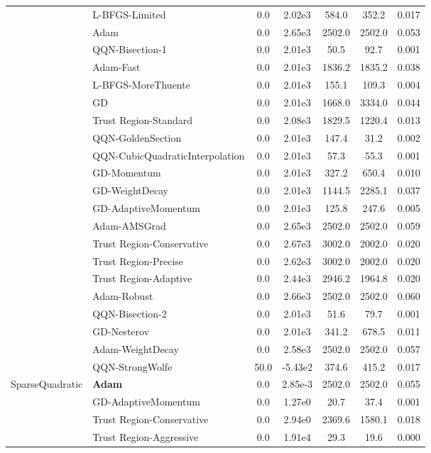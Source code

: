 \documentclass{article}
\begin{document}
\begin{table}[htbp]
{\begin{tabular}{p{2.5cm}p{2.5cm}*{5}{c}}
 & L-BFGS-Limited & 0.0 & 2.02e3 & 584.0 & 352.2 & 0.017 \\
 & Adam & 0.0 & 2.65e3 & 2502.0 & 2502.0 & 0.053 \\
 & QQN-Bisection-1 & 0.0 & 2.01e3 & 50.5 & 92.7 & 0.001 \\
 & Adam-Fast & 0.0 & 2.01e3 & 1836.2 & 1835.2 & 0.038 \\
 & L-BFGS-MoreThuente & 0.0 & 2.01e3 & 155.1 & 109.3 & 0.004 \\
 & GD & 0.0 & 2.01e3 & 1668.0 & 3334.0 & 0.044 \\
 & Trust Region-Standard & 0.0 & 2.08e3 & 1829.5 & 1220.4 & 0.013 \\
 & QQN-GoldenSection & 0.0 & 2.01e3 & 147.4 & 31.2 & 0.002 \\
 & QQN-CubicQuadraticInterpolation & 0.0 & 2.01e3 & 57.3 & 55.3 & 0.001 \\
 & GD-Momentum & 0.0 & 2.01e3 & 327.2 & 650.4 & 0.010 \\
 & GD-WeightDecay & 0.0 & 2.01e3 & 1144.5 & 2285.1 & 0.037 \\
 & GD-AdaptiveMomentum & 0.0 & 2.01e3 & 125.8 & 247.6 & 0.005 \\
 & Adam-AMSGrad & 0.0 & 2.65e3 & 2502.0 & 2502.0 & 0.059 \\
 & Trust Region-Conservative & 0.0 & 2.67e3 & 3002.0 & 2002.0 & 0.020 \\
 & Trust Region-Precise & 0.0 & 2.62e3 & 3002.0 & 2002.0 & 0.020 \\
 & Trust Region-Adaptive & 0.0 & 2.44e3 & 2946.2 & 1964.8 & 0.020 \\
 & Adam-Robust & 0.0 & 2.66e3 & 2502.0 & 2502.0 & 0.060 \\
 & QQN-Bisection-2 & 0.0 & 2.01e3 & 51.6 & 79.7 & 0.001 \\
 & GD-Nesterov & 0.0 & 2.01e3 & 341.2 & 678.5 & 0.011 \\
 & Adam-WeightDecay & 0.0 & 2.58e3 & 2502.0 & 2502.0 & 0.057 \\
 & QQN-StrongWolfe & 50.0 & -5.43e2 & 374.6 & 415.2 & 0.017 \\
\midrule
\multirow{25}{*}{SparseQuadratic} & \textbf{Adam} & 0.0 & 2.85e-3 & 2502.0 & 2502.0 & 0.055 \\
 & GD-AdaptiveMomentum & 0.0 & 1.27e0 & 20.7 & 37.4 & 0.001 \\
 & Trust Region-Conservative & 0.0 & 2.94e0 & 2369.6 & 1580.1 & 0.018 \\
 & Trust Region-Aggressive & 0.0 & 1.91e4 & 29.3 & 19.6 & 0.000 \\

\end{tabular}}
\end{table}
\end{document}
